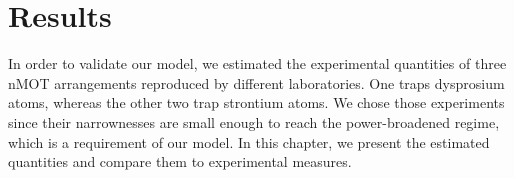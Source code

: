 %
\chapter{Results}
\label{ch:results}
% 

In order to validate our model, we estimated the experimental quantities of three nMOT arrangements reproduced by different laboratories. One traps dysprosium atoms, whereas the other two trap strontium atoms. We chose those experiments since their narrownesses are small enough to reach the power-broadened regime, which is a requirement of our model. In this chapter, we present the estimated quantities and compare them to experimental measures.


%


%
